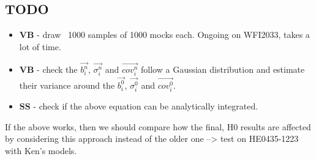 \documentclass[11pt]{scrartcl}
\renewcommand{\vec}{\overrightarrow}  %
\begin{document}
\subsection{TODO}
\begin{itemize}
 \item \textbf{VB} - draw ~1000 samples of 1000 mocks each. Ongoing on 
WFI2033, takes a lot of time.
 \item \textbf{VB} - check the $\vec{b^n_i}$, $\vec{\sigma^n_i}$ and 
$\vec{cov^n_i}$ follow a Gaussian distribution and estimate their 
variance around the $\vec{b^0_i}$, $\vec{\sigma^0_i}$ and 
$\vec{cov^0_i}$.
 \item \textbf{SS} - check if the above equation can be 
analytically integrated.
 
\end{itemize}

If the above works, then we should compare how the final, H0 results 
are affected by considering this approach instead of the older one --> 
test on HE0435-1223 with Ken's models.
\end{document}

